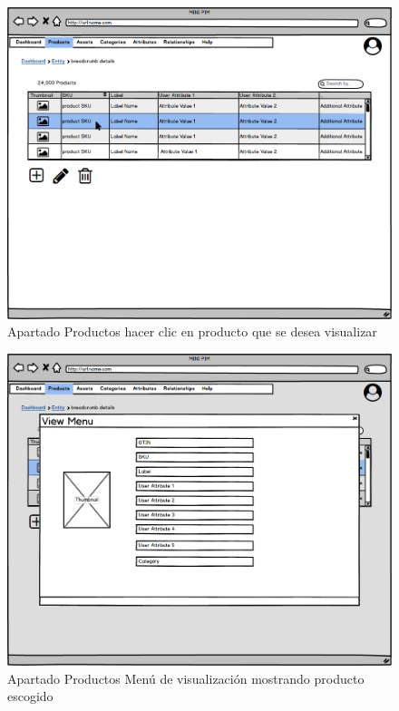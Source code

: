 \begin{figure}[H]
    \includegraphics[width=1\linewidth]{mockups/RF2.X_MostrarProducto(Desde Listado).png}
    \caption{Apartado Productos hacer clic en producto que se desea visualizar}
   \end{figure}
\vspace{1.0cm}

\begin{figure}[H]
    \includegraphics[width=1\linewidth]{mockups/RF2.X_MostrarProducto(Menu visualizacion).png}
    \caption{Apartado Productos Menú de visualización mostrando producto escogido}
   \end{figure}
\vspace{1.0cm}


\newpage %